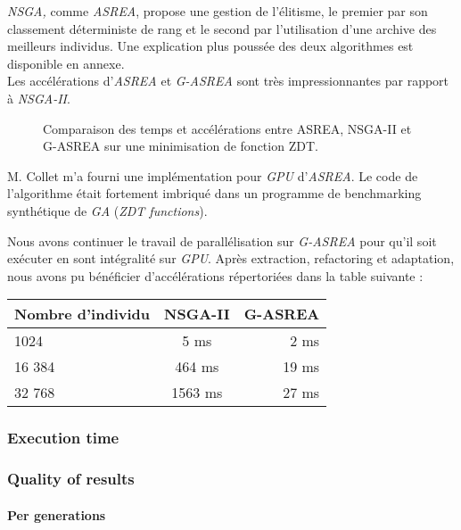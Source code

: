 \documentclass[12pt]{memoir}
\begin{document}
\bigskip
\emph{NSGA,} comme \emph{ASREA}, propose une gestion de l'élitisme, le
premier par son classement déterministe de rang et le second par
l'utilisation d'une archive des meilleurs individus. Une explication
plus poussée des deux algorithmes est disponible en annexe. \\
Les accélérations d'\emph{ASREA} et \emph{G-ASREA} sont très
impressionnantes par rapport à \emph{NSGA-II}.
\begin{figure}[htbp]
	\begin{center}
		\caption{Comparaison des temps et accélérations entre ASREA, NSGA-II et G-ASREA sur une minimisation de fonction ZDT\cite{zitzler2000comparison}.}
	\end{center}
\end{figure}
M. Collet m'a fourni une implémentation pour \textit{GPU} d'\emph{ASREA}. Le
code de l'algorithme était fortement imbriqué dans un programme de
benchmarking synthétique de \emph{GA} (\emph{ZDT functions\cite{zitzler2000comparison}}).

Nous avons continuer le travail de parallélisation sur \textit{G-ASREA} pour
qu'il soit exécuter en sont intégralité sur \textit{GPU}. Après extraction,
refactoring et adaptation, nous avons pu bénéficier d'accélérations
répertoriées dans la table suivante :

\begin{center}
	\begin{tabular}{ |l| c| r| }
		\hline
		Nombre d'individu & NSGA-II & G-ASREA \\
		\hline
		1024 & 5 ms & 2 ms \\
		16 384 & 464 ms & 19 ms\\
		32 768  & 1563 ms& 27 ms\\
		\hline
	\end{tabular}
\end{center}

\subsubsection{Execution time}
\subsubsection{Quality of results}

\paragraph{Per generations}
\end{document}
